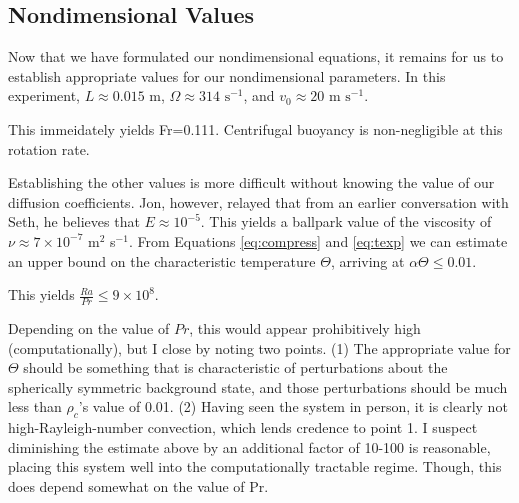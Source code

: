 \subsection{Nondimensional Values}
Now that we have formulated our nondimensional equations, it remains for us to establish appropriate values for our nondimensional parameters.
In this experiment, $L \approx 0.015$ m, $\Omega \approx 314 \,\,\mathrm{ s}^{-1}$, and $v_0 \approx 20 \,\,\mathrm{m}\,\,\mathrm{s}^{-1}$.  

This immeidately yields Fr=0.111.  Centrifugal buoyancy is non-negligible at this rotation rate.

Establishing the other values is more difficult without knowing the value of our diffusion coefficients.  Jon, however, relayed that from an earlier conversation with Seth, he believes that $E\approx 10^{-5}$.   This yields a ballpark value of the viscosity of $\nu\approx 7\times 10^{-7}$ m$^2$ s$^{-1}$.  From Equations \ref{eq:compress} and \ref{eq:texp} we can estimate an upper bound on the characteristic temperature $\Theta$, arriving at $\alpha\Theta\leq 0.01$.   

This yields $\frac{Ra}{Pr}\leq 9\times 10^{8}$.   

Depending on the value of $Pr$, this would appear prohibitively high (computationally), but I close by noting two points.  (1)  The appropriate value for $\Theta$ should be something that is characteristic of perturbations about the spherically symmetric background state, and those perturbations should be much less than $\rho_c$'s value of 0.01.  (2)  Having seen the system in person, it is clearly not high-Rayleigh-number convection, which lends credence to point 1.   I suspect diminishing the estimate above by an additional factor of 10-100 is reasonable, placing this system well into the computationally tractable regime.  Though, this does depend somewhat on the value of Pr.
 

\clearpage



